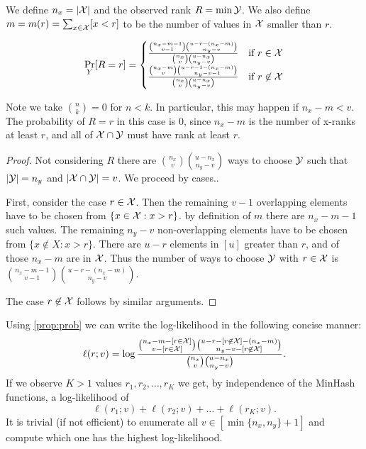 We define $n_x = |\mathcal{X}|$ and the observed rank $R=\min \mathcal{Y}$.
We also define $m=m(r)=\sum_{x\in \mathcal{X}}[x < r]$ to be the number of values in $\mathcal{X}$ smaller than $r$.
\begin{proposition}
\[
   \Pr_Y[R=r]
    =
    \begin{cases}
      \frac{\binom{n_x-m-1}{v-1}\binom{u-r-(n_x-m)}{n_y-v}}{\binom{n_x}{v}\binom{u-n_x}{n_y-v}}
      &
      \text{if $r\in \mathcal{X}$}
       \\
      \frac{\binom{n_x-m}{v}\binom{u-r-1-(n_x-m)}{n_y-v-1}}{\binom{n_x}{v}\binom{u-n_x}{n_y-v}}
      & \text{if $r\not\in \mathcal{X}$}
    \end{cases}
 \]
 \label{prop:prob}
\end{proposition}
%
Note we take $\binom{n}{k}=0$ for $n<k$.
In particular, this may happen if $n_x-m<v$.
The probability of $R=r$ in this case is 0, since $n_x-m$ is the number of x-ranks at least $r$, and all of $\mathcal{X}\cap \mathcal{Y}$ must have rank at least $r$.
\begin{proof}
   Not considering $R$ there are $\binom{n_x}{v}\binom{u-n_x}{n_y-v}$ ways to choose $\mathcal{Y}$ such that $|\mathcal{Y}|=n_y$ and $|\mathcal{X}\cap \mathcal{Y}|=v$.
   We proceed by cases..

   First, consider the case $r\in \mathcal{X}$.
   Then the remaining $v-1$ overlapping elements have to be chosen from $\{x\in \mathcal{X}:x > r\}$.
   by definition of $m$ there are $n_x-m-1$ such values.
   The remaining $n_y-v$ non-overlapping elements have to be chosen from $\{x\not\in X: x > r \}$.
   There are $u-r$ elements in $[u]$ greater than $r$, and of those $n_x-m$ are in $\mathcal{X}$.
   Thus the number of ways to choose $\mathcal{Y}$ with $r\in \mathcal{X}$ is
   $\binom{n_x-m-1}{v-1}\binom{u-r-(n_x-m)}{n_y-v}$.

   The case $r\not\in \mathcal{X}$ follows by similar arguments.
\end{proof}

Using \cref{prop:prob} we can write the log-likelihood in the following concise manner:
\[
   \ell(r; v) = \log \frac{\binom{n_x-m-[r\in \mathcal{X}]}{v-[r\in \mathcal{X}]}\binom{u-r-[r\not\in \mathcal{X}]-(n_x-m)}{n_y-v-[r\not\in \mathcal{X}]}}{\binom{n_x}{v}\binom{u-n_x}{n_y-v}}.
   \label{eq:log-likelihood}
\]
If we observe $K>1$ values $r_1, r_2, \dots, r_K$ we get, by independence of the MinHash functions, a log-likelihood of
\[
   \ell(r_1; v) + \ell(r_2; v) + \dots + \ell(r_K; v).
\]
It is trivial (if not efficient) to enumerate all $v\in[\min\{n_x,n_y\}+1]$ and compute which one has the highest log-likelihood.

